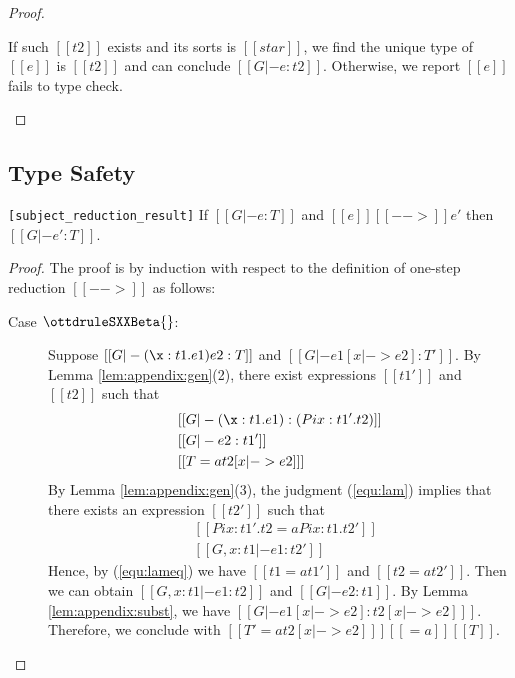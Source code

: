 \begin{proof}
\begin{description}
If such $[[t2]]$ exists and its sorts is
$[[star]]$, we find the unique type of $[[e]]$ is $[[t2]]$ and can conclude $[[G |- e:t2]]$. Otherwise, we
report $[[e]]$ fails to type check.
	\end{description}
\end{proof}

\subsection{Type Safety}
\begin{theorem}
\verb|[subject_reduction_result]|
If $[[G |- e:T]]$ and $[[e]] [[-->]] e'$ then $[[G |- e':T]]$.
\end{theorem}

\begin{proof}
    The proof is by induction with respect to the definition of one-step
reduction $[[-->]]$ as follows:
    \begin{description}
        \item[Case $\ottdruleSXXBeta{}$:] $\quad$ \\
        Suppose $[[G |- (\x:t1.e1)e2 :T]]$ and $[[G |- e1 [x |-> e2] :T']]$. By
Lemma \ref{lem:appendix:gen}(2), there exist expressions $[[t1']]$ and $[[t2]]$
such that 
        \begin{align}
            &[[G |- (\x:t1.e1):(Pi x:t1'.t2)]] \label{equ:lam} \\
            &[[G |- e2:t1']] \nonumber \\
            &[[T =a t2 [x |-> e2] ]] \nonumber
        \end{align}
        By Lemma \ref{lem:appendix:gen}(3), the judgment (\ref{equ:lam})
implies that there exists an expression $[[t2']]$ such that
        \begin{align}
            &[[Pi x:t1'.t2 =a Pi x:t1.t2']] \label{equ:lameq}\\
            &[[G, x:t1 |- e1:t2']] \nonumber
        \end{align}
        Hence, by (\ref{equ:lameq}) we have $[[t1 =a t1']]$ and $[[t2 =a
t2']]$. Then we can obtain $[[G, x:t1 |- e1:t2]]$ and $[[G |- e2:t1]]$. By
Lemma \ref{lem:appendix:subst}, we have $[[G |- e1[x |-> e2] : t2[x |-> e2]
]]$. Therefore, we conclude with $[[T' =a t2[x |-> e2] ]] [[=a]] [[T]]$.
        

\end{description}
\end{proof}
